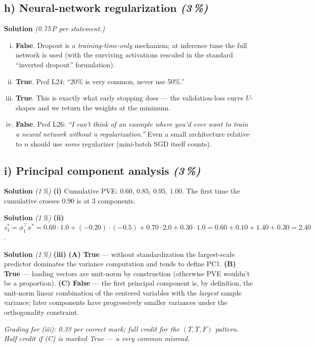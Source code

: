 \documentclass[11pt,a4paper]{article}
\newcommand{\subpoints}[1]{\textit{(#1\,\%)}}
\newcommand{\sol}{\noindent\textbf{Solution}}
\begin{document}
\subsection*{h) Neural-network regularization \subpoints{3}}
\sol{} \emph{(0.75\,P per statement.)}
\begin{enumerate}[(i)]
  \item \textbf{False}. Dropout is a \emph{training-time-only} mechanism; at inference time the
        full network is used (with the surviving activations rescaled in the standard ``inverted
        dropout'' formulation).
  \item \textbf{True}. Prof L24: ``20\% is very common, never use 50\%.''
  \item \textbf{True}. This is exactly what early stopping does --- the validation-loss curve
        $U$-shapes and we return the weights at the minimum.
  \item \textbf{False}. Prof L26: \emph{``I can't think of an example where you'd ever want to
        train a neural network without a regularization.''} Even a small architecture relative to
        $n$ should use \emph{some} regularizer (mini-batch SGD itself counts).
\end{enumerate}

\subsection*{i) Principal component analysis \subpoints{3}}

\sol{} \subpoints{1} \textbf{(i)} Cumulative PVE: $0.60$, $0.85$, $0.95$, $1.00$. The first time
the cumulative crosses $0.90$ is at $\boxed{3}$ components.

\medskip
\sol{} \subpoints{1} \textbf{(ii)}
$z^*_1 = \phi_1^\top x^* = 0.60\cdot 1.0 + (-0.20)\cdot(-0.5) + 0.70\cdot 2.0 + 0.30\cdot 1.0
   = 0.60 + 0.10 + 1.40 + 0.30 = \boxed{2.40}$.

\medskip
\sol{} \subpoints{1} \textbf{(iii)} \textbf{(A) True} --- without standardization the largest-scale
predictor dominates the variance computation and tends to define PC1. \textbf{(B) True} --- loading
vectors are unit-norm by construction (otherwise PVE wouldn't be a proportion). \textbf{(C) False}
--- the first principal component is, by definition, the unit-norm linear combination of the
centered variables with the \emph{largest} sample variance; later components have progressively
smaller variances under the orthogonality constraint.

\noindent\emph{Grading for (iii): 0.33 per correct mark; full credit for the $(T,T,F)$ pattern.
Half credit if (C) is marked True --- a very common misread.}
\end{document}
